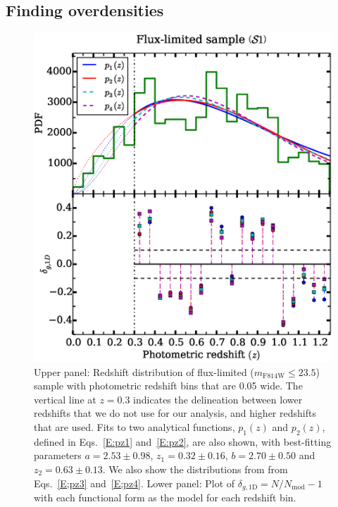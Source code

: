 \documentclass[twocolumn,useAMS,usenatbib]{mn2e}
\newcommand{\rachel}[1]{{\textcolor{red}{#1}}}
\begin{document}
\subsection{Finding overdensities}
\label{sub:overdensities}
\begin{figure}
 \centering
  \includegraphics[width=\columnwidth]{redshift_fluxlimited}
  \caption{Upper panel: Redshift distribution of flux-limited
    ($m_\text{F814W}\le 23.5$) sample with photometric redshift bins
    that are 0.05 wide. The vertical line at $z=0.3$ indicates the delineation between lower redshifts that we do not use for our analysis, and higher redshifts that are used. Fits to two analytical functions, $p_1(z)$ and $p_2(z)$, defined in Eqs.~\ref{E:pz1} and~\ref{E:pz2}, are also shown, with best-fitting parameters $a=2.53\pm0.98$, $z_1=0.32\pm0.16$, $b=2.70\pm0.50$ and $z_2=0.63\pm0.13$.  We also show the distributions from \protect\cite{2004ApJ...617..765C} from Eqs.~\ref{E;pz3} and~\ref{E;pz4}. 
           Lower panel: Plot of $\delta_{g,\text{1D}} =
           N/N_{\text{mod}}-1$ with each functional form as the model
           for each redshift bin.
}
  \label{fig:redshift_fluxlimited}
\end{figure}
\end{document}
